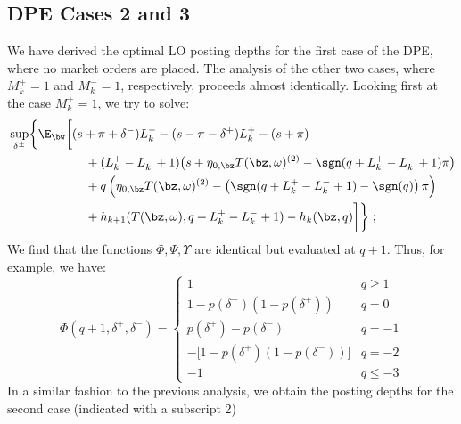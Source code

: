 \documentclass[12pt]{article}
\begin{document}
\subsection*{DPE Cases 2 and 3}
We have derived the optimal LO posting depths for the first case of the DPE, where no market orders are placed. The analysis of the other two cases, where $M_k^+ = 1$ and $M_k^- = 1$, respectively, proceeds almost identically. Looking first at the case $M_k^+ = 1$, we try to solve:
\begin{equation}
\label{eq:discretesup2}
\begin{split}
& \sup_{\delta^\pm} \biggl\lbrace \E_{\bw} \biggl[
(s + \pi + \delta^-)L_k^- - (s - \pi - \delta^+)L_k^+ - (s + \pi)\\
& \hphantom{\sup_{\bu} \biggl\lbrace \E_{\bw} \biggl[ {}+{}} + (L_k^+ - L_k^- +1) \bigl( s + \eta_{0,\bz} T(\bz, \omega)^{(2)}  -\sgn( q + L_k^+ - L_k^- +1)\pi   \bigr) \\
& \hphantom{\sup_{\bu} \biggl\lbrace \E_{\bw} \biggl[ {}+{}} + q\left( \eta_{0,\bz} T(\bz, \omega)^{(2)}  -\left( \sgn( q + L_k^+ - L_k^- +1) - \sgn(q) \right) \pi \right) \\
& \hphantom{\sup_{\bu} \biggl\lbrace \E_{\bw} \biggl[ {}+{}} + h_{k+1}(T(\bz,\omega), q + L_k^+ - L_k^- + 1) -  h_k(\bz,q) \biggr] \biggr\rbrace \; ; \\
\end{split}
\end{equation}
We find that the functions $\Phi, \Psi, \Upsilon$ are identical but evaluated at $q+1$. Thus, for example, we have:
\begin{equation}
\label{eq:discretephioffset}
\Phi(q+1, \delta^+, \delta^-) = \begin{cases} 
1 & q \geq 1 \\
1 - p(\delta^-)(1 - p(\delta^+)) & q = 0 \\
p(\delta^+) - p(\delta^-) & q = -1 \\
-\bigl[ 1 - p(\delta^+)(1 - p(\delta^-)) \bigr] & q = -2 \\
-1 & q \leq -3
\end{cases}
\end{equation}
In a similar fashion to the previous analysis, we obtain the posting depths for the second case (indicated with a subscript 2)
\end{document}
